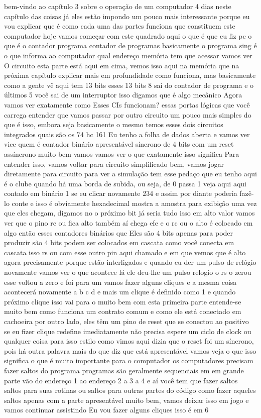 \documentclass[oneside,11pt]{memoir} %
\begin{document}
bem-vindo ao capítulo 3 sobre o  operação de um computador 4  dias neste capítulo das coisas já  eles estão impondo um pouco mais  interessante porque eu vou explicar que é como cada uma das partes funciona  que constituem este computador hoje  vamos começar com este quadrado aqui  o que é que eu fiz pc o que é o contador  programa contador de programas  basicamente o programa sing é o que  informa ao computador qual endereço  memória tem que acessar vamos ver  O circuito  esta parte está aqui em cima, vemos isso  aqui na memória que na próxima  capítulo explicar mais em profundidade  como funciona, mas basicamente como  a gente vê aqui tem 13 bits esses 13 bits 8  sai do contador de programa e o  últimos 5 você sai de um interruptor isso  digamos que é algo mecânico  Agora vamos ver exatamente como  Esses CIs funcionam?  essas portas lógicas que você carrega  entender que vamos passar por outro  circuito um pouco mais simples do que  é isso, embora seja basicamente o mesmo  temos esses dois circuitos integrados  quais são os 74 hc 161  Eu tenho a folha de dados aberta e  vamos ver vice quem é contador  binário apresentável síncrono de 4 bits  com um reset assíncrono muito bem vamos  vamos ver o que exatamente isso significa  Para entender isso, vamos voltar para  circuito simplificado  bem, vamos jogar diretamente para  circuito para ver a simulação  tem esse pedaço que eu tenho aqui é o clube  quando há uma borda de subida, ou seja,  de 0 passa 1 veja aqui aqui contado em  binário 1 se eu clicar novamente  234 e assim por diante poderia fazê-lo  conte e isso é obviamente  hexadecimal mostra a amostra para  exibição  uma vez que eles chegam, digamos no  o próximo bit já seria tudo isso em  alto valor vamos ver que o pino rc ou  fica alto também aí chega  efe e o rc ou o alto é colocado em algo  então esses contadores binários que  Eles são 4 bits apenas para poder produzir  são 4 bits podem ser colocados em cascata  como você conecta em cascata isso  rs ou com esse outro pin aqui chamado  e em que vemos que é alto agora  precisamente porque estão interligados e  quando eu der um pulso de relógio novamente  vamos ver o que acontece lá ele deu-lhe um pulso  relogio o rs o zerou esse  voltou a zero e foi para um  vamos fazer alguns cliques  e a mesma coisa acontecerá novamente a b c d  e mais um clique é definido como 1 e quando  próximo clique  isso vai para o  muito bem  com esta primeira parte entende-se  muito bem como funciona um contrato  comum e como ele está conectado em  cachoeira  por outro lado, eles têm um pino de reset que  se conectou ao positivo se eu fizer  clique  redefine imediatamente não precisa  espere um ciclo de clock ou qualquer coisa para isso  estilo como vimos aqui dizia que o reset  foi um síncrono, pois há outra palavra  mais do que diz que está apresentável vamos  veja o que isso significa  o que é muito importante para o  computador  os computadores precisam fazer saltos  do programa  programas são geralmente sequenciais em  em grande parte vão do endereço 1 ao endereço  2 a 3 a 4 e aí você tem que fazer  saltos saltos para suas rotinas ou saltos para  outras partes do código como fazer  aqueles saltos apenas com a parte  apresentável  muito bem, vamos deixar isso em jogo e  vamos continuar assistindo  Eu vou fazer alguns cliques isso é  em 6 
\end{document}
